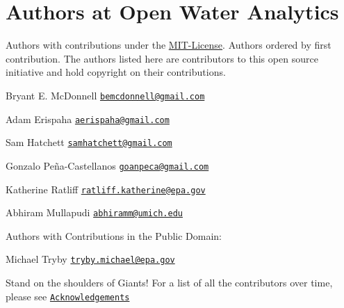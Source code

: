 \hypertarget{group___a_u_t_h_o_r_s}{}\section{Authors at Open Water Analytics}
\label{group___a_u_t_h_o_r_s}
Authors with contributions under the \hyperlink{group___m_i_t-_license}{M\+I\+T-\/\+License}. Authors ordered by first contribution. The authors listed here are contributors to this open source initiative and hold copyright on their contributions.


\begin{DoxyItemize}
\item Bryant E. Mc\+Donnell \href{mailto:bemcdonnell@gmail.com}{\tt bemcdonnell@gmail.\+com}
\item Adam Erispaha \href{mailto:aerispaha@gmail.com}{\tt aerispaha@gmail.\+com}
\item Sam Hatchett \href{mailto:samhatchett@gmail.com}{\tt samhatchett@gmail.\+com}
\item Gonzalo Peña-\/\+Castellanos \href{mailto:goanpeca@gmail.com}{\tt goanpeca@gmail.\+com}
\item Katherine Ratliff \href{mailto:ratliff.katherine@epa.gov}{\tt ratliff.\+katherine@epa.\+gov}
\item Abhiram Mullapudi \href{mailto:abhiramm@umich.edu}{\tt abhiramm@umich.\+edu}
\end{DoxyItemize}

Authors with Contributions in the Public Domain\+:
\begin{DoxyItemize}
\item Michael Tryby \href{mailto:tryby.michael@epa.gov}{\tt tryby.\+michael@epa.\+gov}
\end{DoxyItemize}

Stand on the shoulders of Giants! For a list of all the contributors over time, please see \href{https://github.com/OpenWaterAnalytics/Stormwater-Management-Model/wiki/Acknowledgements}{\tt Acknowledgements} 